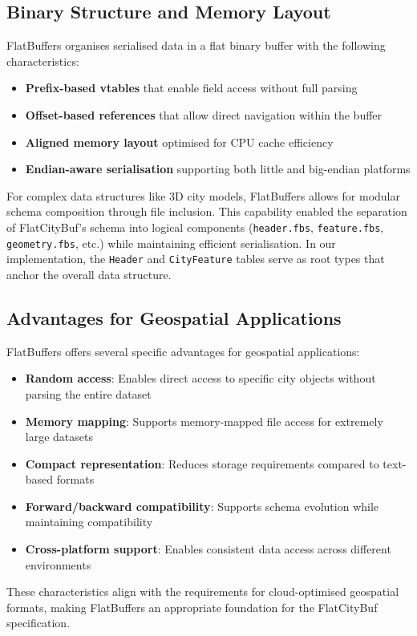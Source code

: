 \subsection{Binary Structure and Memory Layout}
\label{subsec:binary_structure}

FlatBuffers organises serialised data in a flat binary buffer with the following characteristics:

\begin{itemize}
    \item \textbf{Prefix-based vtables} that enable field access without full parsing
    \item \textbf{Offset-based references} that allow direct navigation within the buffer
    \item \textbf{Aligned memory layout} optimised for CPU cache efficiency
    \item \textbf{Endian-aware serialisation} supporting both little and big-endian platforms
\end{itemize}

For complex data structures like 3D city models, FlatBuffers allows for modular schema composition through file inclusion. This capability enabled the separation of FlatCityBuf's schema into logical components (\texttt{header.fbs}, \texttt{feature.fbs}, \texttt{geometry.fbs}, etc.) while maintaining efficient serialisation. In our implementation, the \texttt{Header} and \texttt{CityFeature} tables serve as root types that anchor the overall data structure.

\subsection{Advantages for Geospatial Applications}
\label{subsec:geospatial_advantages}

FlatBuffers offers several specific advantages for geospatial applications:

\begin{itemize}
    \item \textbf{Random access}: Enables direct access to specific city objects without parsing the entire dataset
    \item \textbf{Memory mapping}: Supports memory-mapped file access for extremely large datasets
    \item \textbf{Compact representation}: Reduces storage requirements compared to text-based formats
    \item \textbf{Forward/backward compatibility}: Supports schema evolution while maintaining compatibility
    \item \textbf{Cross-platform support}: Enables consistent data access across different environments
\end{itemize}

These characteristics align with the requirements for cloud-optimised geospatial formats, making FlatBuffers an appropriate foundation for the FlatCityBuf specification.
